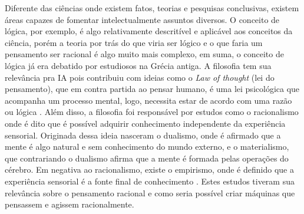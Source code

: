 Diferente das ciências onde existem fatos, teorias e pesquisas conclusivas, existem áreas capazes de fomentar intelectualmente assuntos diversos. O conceito de lógica, por exemplo, é algo relativamente descritível e aplicável aos conceitos da ciência, porém a teoria por trás do que viria ser lógico e o que faria um pensamento ser racional é algo muito mais complexo, em suma, o conceito de lógica já era debatido por estudiosos na Grécia antiga. A filosofia tem sua relevância pra IA pois contribuiu com ideias como o \textit{Law of thought} (lei do pensamento), que em contra partida ao pensar humano, é uma lei psicológica que acompanha um processo mental, logo, necessita estar de acordo com uma razão ou lógica \cite{frege1956thought, russell2003artificial}. Além disso, a filosofia foi responsável por estudos como o racionalismo onde é dito que é possível adquirir conhecimento independente da experiência sensorial. Originada dessa ideia nasceram o dualismo, onde é afirmado que a mente é algo natural e sem conhecimento do mundo externo, e o materialismo, que contrariando o dualismo afirma que a mente é formada pelas operações do cérebro. Em negativa ao racionalismo, existe o empirismo, onde é definido que a experiência sensorial é a fonte final de conhecimento \cite[6]{rationalismvsempiricism, descartes2013rene, russell2003artificial}. Estes estudos tiveram sua relevância sobre o pensamento racional e como seria possível criar máquinas que pensassem e agissem racionalmente.
